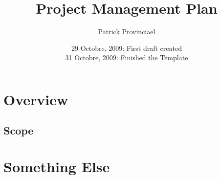 \documentclass[a4paper, 12pt]{article}
\begin{document}
\title{Project Management Plan}
\author{Patrick Provinciael}
\date{	29 Octobre, 2009: First draft created \\
	31 Octobre, 2009: Finished the Template}
\maketitle

\section{Overview}

\subsection{Scope}

\section{Something Else}
\end{document}
